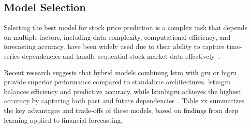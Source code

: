 \subsection{Model Selection}

Selecting the best model for stock price prediction is a complex task that depends on
multiple factors, including data complexity, computational efficiency, and forecasting 
accuracy.  have been widely used due to their ability to capture 
time-series dependencies and handle sequential stock market data 
effectively~\parencite{shaban2024SMPDL}.

Recent research suggests that hybrid models combining \acrshort{lstm} with 
\acrshort{gru} or \acrshort{bigru} provide superior performance compared to standalone
architectures. \acrshort{lstmgru} balances efficiency and predictive accuracy, while 
\acrshort{lstmbigru} achieves the highest accuracy by capturing both past and future
dependencies~\parencite{chang2024StockPrediction}. Table xx summarizes the key advantages and trade-offs of these models, based on findings from deep learning applied to financial forecasting.

